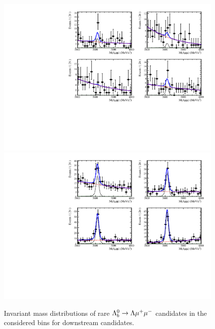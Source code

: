 %
\begin{figure}
\centering
\includegraphics[width=1.\textwidth]{Lmumu/figs/MassFits/q2_fits_DD_plot2.pdf}
\includegraphics[width=1.\textwidth]{Lmumu/figs/MassFits/q2_fits_DD_plot1.pdf}
\caption{Invariant mass distributions of rare $\Lambda^0_b\rightarrow\Lambda\mu^+\mu^-$ candidates in the considered \qsq bins
 for downstream candidates. }
\label{fig:Lb_differentialFitDD}
\end{figure}

